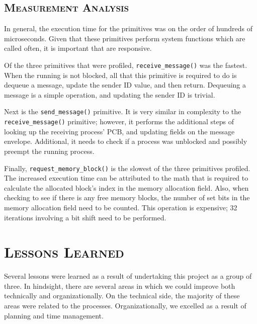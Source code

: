 \documentclass[oneside]{report}
\begin{document}
\begin{table}[H]
    \caption{Execution time of primitives}
    \label{measurementdata}
\end{table}

\section{\textsc{Measurement Analysis}}

In general, the execution time for the primitives was on the order of
hundreds of microseconds. Given that these primitives perform system
functions which are called often, it is important that are responsive.

Of the three primitives that were profiled,
\texttt{receive\_message()} was the fastest. When the running is not
blocked, all that this primitive is required to do is dequeue a
message, update the sender ID value, and then return. Dequeuing a
message is a simple operation, and updating the sender ID is trivial.

Next is the \texttt{send\_message()} primitive. It is very similar in
complexity to the \texttt{receive\_message()} primitive; however, it
performs the additional steps of looking up the receiving process'
PCB, and updating fields on the message envelope. Additional, it needs
to check if a process was unblocked and possibly preempt the running
process.

Finally, \texttt{request\_memory\_block()} is the slowest of the three
primitives profiled. The increased execution time can be attributed to
the math that is required to calculate the allocated block's index in
the memory allocation field. Also, when checking to see if there is
any free memory blocks, the number of set bits in the memory
allocation field need to be counted. This operation is expensive; 32
iterations involving a bit shift need to be performed.

\chapter{\textsc{Lessons Learned}}
Several lessons were learned as a result of undertaking this project as a group
of three. In hindsight, there are several areas in which we could improve both
technically and organizationally. On the technical side, the majority of these
areas were related to the processes. Organizationally, we excelled as a result
of planning and time management.
\end{document}
